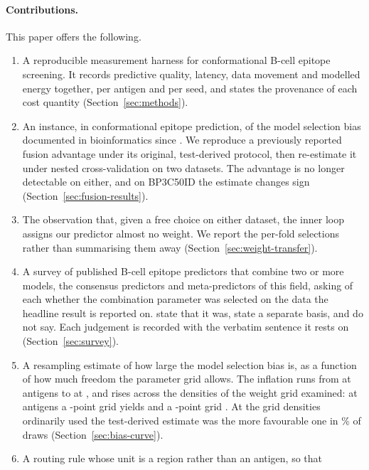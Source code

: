 \paragraph{Contributions.} This paper offers the following.
\begin{enumerate}
  \item A reproducible measurement harness for conformational B-cell epitope
  screening. It records predictive quality, latency, data movement and modelled
  energy together, per antigen and per seed, and states the provenance of each
  cost quantity (Section~\ref{sec:methods}).
  \item An instance, in conformational epitope prediction, of the model
  selection bias documented in bioinformatics since
  \citet{varma2006bias}. We reproduce a previously reported fusion advantage
  under its original, test-derived protocol, then re-estimate it under nested
  cross-validation on two datasets. The advantage is no longer detectable on
  either, and on BP3C50ID the estimate changes sign
  (Section~\ref{sec:fusion-results}).
  \item The observation that, given a free choice on either dataset, the
  inner loop assigns our predictor almost no weight. We report the
  per-fold selections rather than summarising them away
  (Section~\ref{sec:weight-transfer}).
  \item A survey of \SurveyAssessed{} published B-cell epitope predictors that
  combine two or more models, the consensus predictors and meta-predictors of
  this field, asking of each whether the combination parameter was selected on
  the data the headline result is reported on.
  \SurveyLeakage{} state that it was, \SurveyClean{} state a separate basis,
  and \SurveyUnreported{} do not say. Each judgement is recorded with the
  verbatim sentence it rests on (Section~\ref{sec:survey}).
  \item A resampling estimate of how large the model selection bias is, as a
  function of how much freedom the parameter grid allows. The inflation runs from
  \BiasAtSmallestN{} \BiasMetric{} at \BiasSmallestN{} antigens to
  \BiasAtLargestN{} at \BiasLargestN{}, and rises across the densities of the
  weight grid examined: at \BiasGridRefN{} antigens a \BiasCoarseGridPoints{}-point
  grid yields \BiasCoarseGridBias{} and a \BiasFineGridPoints{}-point grid
  \BiasFineGridBias{}. At the grid densities ordinarily used the test-derived
  estimate was the more favourable one in
  \BiasPositiveShareLargestN{}\% of draws (Section~\ref{sec:bias-curve}).
  \item A routing rule whose unit is a region rather than an antigen, so that

\end{enumerate}
